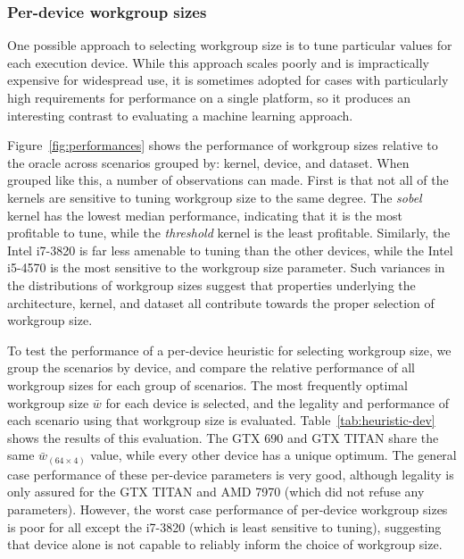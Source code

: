 \subsubsection{Per-device workgroup sizes}

\begin{table}
\scriptsize
\centering
{}

\caption{%
  Selecting workgroup size using a per-device heuristic. The mode
  optimal workgroup size for each device type $\bar{w}$ is evaluated
  based on legality, and relative performance to the oracle (minimum
  and average) when legal.%
}
\label{tab:heuristic-dev}
\end{table}

One possible approach to selecting workgroup size is to tune
particular values for each execution device. While this approach
scales poorly and is impractically expensive for widespread use, it is
sometimes adopted for cases with particularly high requirements for
performance on a single platform, so it produces an interesting
contrast to evaluating a machine learning approach.

Figure~\ref{fig:performances} shows the performance of workgroup sizes
relative to the oracle across scenarios grouped by: kernel, device,
and dataset. When grouped like this, a number of observations can
made. First is that not all of the kernels are sensitive to tuning
workgroup size to the same degree. The \emph{sobel} kernel has the
lowest median performance, indicating that it is the most profitable
to tune, while the \emph{threshold} kernel is the least
profitable. Similarly, the Intel i7-3820 is far less amenable to
tuning than the other devices, while the Intel i5-4570 is the most
sensitive to the workgroup size parameter. Such variances in the
distributions of workgroup sizes suggest that properties underlying
the architecture, kernel, and dataset all contribute towards the
proper selection of workgroup size.

To test the performance of a per-device heuristic for selecting
workgroup size, we group the scenarios by device, and compare the
relative performance of all workgroup sizes for each group of
scenarios. The most frequently optimal workgroup size $\bar{w}$ for
each device is selected, and the legality and performance of each
scenario using that workgroup size is evaluated.
Table~\ref{tab:heuristic-dev} shows the results of this evaluation.
The GTX 690 and GTX TITAN share the same $\bar{w}_{(64 \times 4)}$
value, while every other device has a unique optimum. The general case
performance of these per-device parameters is very good, although
legality is only assured for the GTX TITAN and AMD 7970 (which did not
refuse any parameters). However, the worst case performance of
per-device workgroup sizes is poor for all except the i7-3820 (which
is least sensitive to tuning), suggesting that device alone is not
capable to reliably inform the choice of workgroup size.


